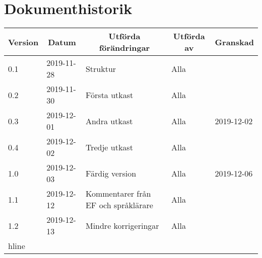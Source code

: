 \documentclass[10pt,oneside,swedish]{lips-no_customer}
\begin{document}
\section*{Dokumenthistorik}
\begin{tabular}{|p{}|p{}|p{}|p{}|p{}|} 
  \hline
  \multicolumn{1}{|c}{\bfseries Version} &
  \multicolumn{1}{|c}{\bfseries Datum} &
  \multicolumn{1}{|c}{\bfseries Utförda förändringar} &
  \multicolumn{1}{|c}{\bfseries Utförda av} &
  \multicolumn{1}{|c|}{\bfseries Granskad}\\
  \hline\hline
  0.1 & 2019-11-28 & Struktur & Alla & \\\hline
  0.2 & 2019-11-30 & Första utkast & Alla & \\\hline
  0.3 & 2019-12-01 & Andra utkast & Alla & 2019-12-02 \\\hline
  0.4 & 2019-12-02 & Tredje utkast & Alla & \\\hline
  1.0 & 2019-12-03 & Färdig version & Alla & 2019-12-06 \\\hline
  1.1 & 2019-12-12 & Kommentarer från EF och språklärare & Alla & \\\hline
	1.2 & 2019-12-13 & Mindre korrigeringar & Alla & \\hline

\end{tabular}

\cleardoublepage
\tableofcontents

\cleardoublepage
\listoffigures
\listoftables
\cleardoublepage

\cfoot{\thepage}








\cleardoublepage
\appendix





\end{document}
